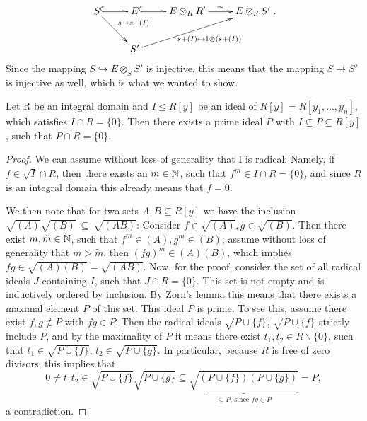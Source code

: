 \begin{prop}
\begin{bew}
\[\begin{xy}
 \xymatrix{
      S \ar@^{(->}[r] \ar[rd]^-{ s \mapsto s + (I)} &E \ar@^{(->}[r] & E \otimes_R R' \ar[r]^\sim & E \otimes_S S' \\ 
      & S' \ar[urr]_-{~~~~~ s + (I) \mapsto 1 \otimes (s + (I)) }}
\end{xy}.
\]
Since the mapping $S \hookrightarrow E \otimes_S S'$ is injective, this means that the mapping $S \rightarrow S'$ is injective as well, which is what we wanted to show.
\end{bew}
\end{prop}


\begin{lem}\label{primeoverp1}
Let R be an integral domain and $I \unlhd R[y]$ be an ideal of $R[y] = R[y_1,\ldots,y_n]$, which satisfies $I \cap R = \{ 0 \}$.
Then there exists a prime ideal $P$ with $I \subseteq P \subseteq R[y] $, such that $P \cap R = \{0\}$.
\begin{proof}
We can assume without loss of generality that I is radical:
Namely, if $f \in \sqrt{I} \cap R$, then there exists an $m \in \mathbb{N}$, such that $f^m \in I \cap R = \{0\}$, and since $R$ is an integral domain this already means that $f = 0$. 

We then note that for two sets $A,B \subseteq R[y]$ we have the inclusion \\ $\sqrt{(A)}\sqrt{(B)}~\subseteq~\sqrt{(AB)}$: Consider $f \in \sqrt{(A)}, g \in \sqrt{(B)}$. Then there exist $m, \tilde m \in \mathbb{N}$, such that $f^m \in (A), g^{\tilde m} \in (B)$;
 assume without loss of generality that $m > \tilde m$, then $(fg)^m \in (A)(B)$, which implies $fg \in \sqrt{(A)(B)} = \sqrt{(AB)}$.
Now, for the proof, consider the set of all radical ideals $J$ containing $I$, such that $J \cap R = \{0\}$. This set is not empty and is inductively ordered by inclusion.
By Zorn's lemma this means that there exists a maximal element $P$ of this set. This ideal $P$ is prime. To see this, assume there exist $f,g \notin P$ with $fg \in P$. 
Then the radical ideals $\sqrt{P \cup \{f\}}$, $\sqrt{P \cup \{f\}}$ strictly include $P$, and by the maximality of $P$ it means there exist $t_1, t_2 \in R\backslash\{0\}$, such that
$t_1 \in \sqrt{P \cup \{f\}}$, $t_2 \in \sqrt{P \cup \{g\}}$. In particular, because $R$ is free of zero divisors, this implies that
 \[0 \neq t_1t_2 \in \sqrt{P \cup \{f\}}\sqrt{P \cup \{g\}} \subseteq  \underbrace{\sqrt{(P \cup \{f\})(P \cup \{g\})}}_{\subseteq P\text{, since }fg \in P} = P, \]
a contradiction.
\end{proof}
\end{lem}


